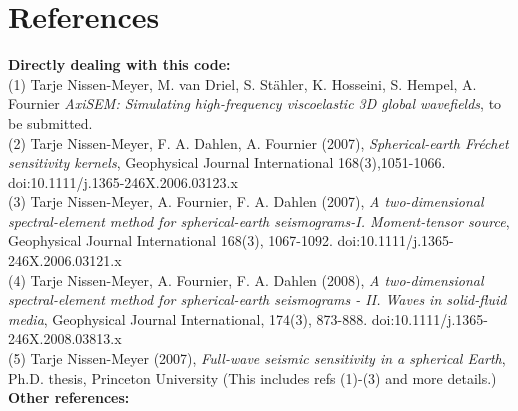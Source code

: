 \documentclass[11pt,letter,fleqn,english,notitlepage]{article}
\begin{document}
\section{References}

\noindent \textbf{Directly dealing with this code:}\vspace*{0.2cm}\\

(1) Tarje Nissen-Meyer, M. van Driel, S. St\"ahler, K. Hosseini,
S. Hempel, A. Fournier \textit{AxiSEM: Simulating high-frequency viscoelastic 3D global
wavefields}, to be submitted.\\

(2) Tarje Nissen-Meyer, F. A. Dahlen, A. Fournier (2007),
\textit{Spherical-earth Fr\'{e}chet sensitivity kernels},        
Geophysical Journal International 168(3),1051-1066. 
doi:10.1111/j.1365-246X.2006.03123.x                \\
                                                        
(3) Tarje Nissen-Meyer, A. Fournier, F. A. Dahlen (2007), 
\textit{A two-dimensional spectral-element method for
spherical-earth seismograms-I. Moment-tensor source}, 
Geophysical Journal International 168(3), 1067-1092. 
doi:10.1111/j.1365-246X.2006.03121.x                 \\
                                                       
(4) Tarje Nissen-Meyer, A. Fournier, F. A. Dahlen (2008),  
\textit{A two-dimensional spectral-element method for   
spherical-earth seismograms - II. Waves in solid-fluid media},
Geophysical Journal International, 174(3), 873-888.
doi:10.1111/j.1365-246X.2008.03813.x\\

(5) Tarje Nissen-Meyer (2007),
\textit{Full-wave seismic sensitivity in a spherical Earth},
Ph.D. thesis, Princeton University
(This includes refs (1)-(3) and more details.)\\
% 


\noindent \textbf{Other references:}\vspace*{0.2cm}
\end{document}
